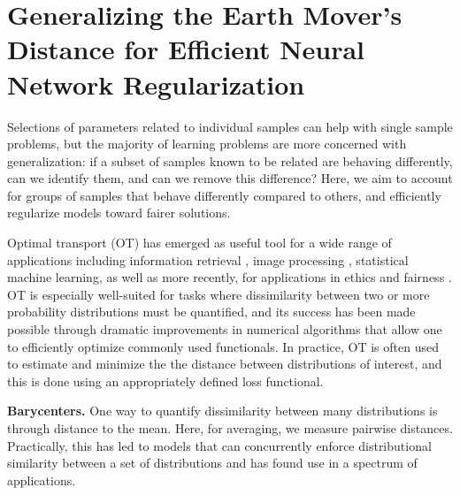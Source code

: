 \chapter{Generalizing the Earth Mover's Distance for Efficient Neural Network Regularization} \label{chap:demd}
Selections of parameters related to individual samples can help with single sample problems,
but the majority of learning problems are more concerned with generalization: if a subset of samples known to be related are behaving differently, can we identify them, and can we remove this difference?
Here, we aim to account for groups of samples that behave differently compared to others, and efficiently regularize models toward fairer solutions.


Optimal transport (OT) has emerged as useful tool for a wide range of applications including information retrieval \cite{balikas2018cross,yurochkin2019hierarchical}, image processing \cite{otip}, statistical machine learning, as well as more recently, for applications in ethics and fairness \cite{kwegyiraggrey2021relative}. 
OT is especially well-suited for tasks where dissimilarity between two or more probability distributions must be quantified,
and its success has been made possible through dramatic improvements in numerical algorithms \cite{cuturi2013sinkhorn,solomon2015convolutional} that allow one to efficiently optimize commonly used functionals.
In practice, OT is often used to estimate and minimize the 
the distance between distributions of interest, 
and this is done using an appropriately defined loss functional. %


{\bf Barycenters.} 
One way to quantify dissimilarity between many distributions is through distance to the mean. Here, for averaging,  
we measure pairwise distances.
Practically, this has led to models that can 
concurrently enforce distributional similarity between a 
set of distributions and has found use in 
a spectrum of applications.

